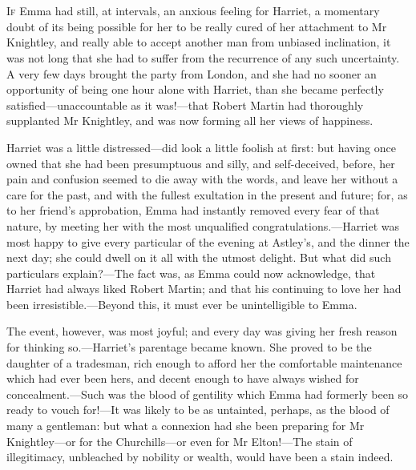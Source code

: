 \chapter[Chapter \thechapter]{}
\lettrine[lraise=0.3]{I}{f} Emma had still, at intervals, an anxious feeling for Harriet, a momentary doubt of its being possible for her to be really cured of her attachment to Mr Knightley, and really able to accept another man from unbiased inclination, it was not long that she had to suffer from the recurrence of any such uncertainty. A very few days brought the party from London, and she had no sooner an opportunity of being one hour alone with Harriet, than she became perfectly satisfied—unaccountable as it was!—that Robert Martin had thoroughly supplanted Mr Knightley, and was now forming all her views of happiness.

Harriet was a little distressed—did look a little foolish at first: but having once owned that she had been presumptuous and silly, and self-deceived, before, her pain and confusion seemed to die away with the words, and leave her without a care for the past, and with the fullest exultation in the present and future; for, as to her friend's approbation, Emma had instantly removed every fear of that nature, by meeting her with the most unqualified congratulations.—Harriet was most happy to give every particular of the evening at Astley's, and the dinner the next day; she could dwell on it all with the utmost delight. But what did such particulars explain?—The fact was, as Emma could now acknowledge, that Harriet had always liked Robert Martin; and that his continuing to love her had been irresistible.—Beyond this, it must ever be unintelligible to Emma.

The event, however, was most joyful; and every day was giving her fresh reason for thinking so.—Harriet's parentage became known. She proved to be the daughter of a tradesman, rich enough to afford her the comfortable maintenance which had ever been hers, and decent enough to have always wished for concealment.—Such was the blood of gentility which Emma had formerly been so ready to vouch for!—It was likely to be as untainted, perhaps, as the blood of many a gentleman: but what a connexion had she been preparing for Mr Knightley—or for the Churchills—or even for Mr Elton!—The stain of illegitimacy, unbleached by nobility or wealth, would have been a stain indeed.

